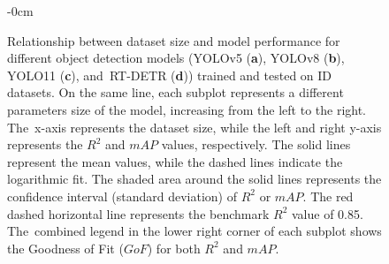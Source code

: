 \documentclass[12pt,a4paper,oneside]{report}
\newlength{\extralength}
\begin{document}
\begin{figure}[H]
\begin{adjustwidth}{-\extralength}{0cm}
\end{adjustwidth}
 \caption{Relationship %
 between dataset size and model performance 
  for different object detection models (YOLOv5 (\textbf{a}), YOLOv8 (\textbf{b}), 
  YOLO11 (\textbf{c}), and~RT-DETR (\textbf{d})) trained and tested on ID datasets. 
  On the same line, each subplot represents a different parameters size of the model,
  increasing from the left to the right. The~x-axis represents the dataset size, while
  the left and right y-axis represents the $R^2$ and $mAP$ values, respectively. 
  The solid lines represent the mean values, while the dashed lines indicate the logarithmic fit.
  The shaded area around the solid lines represents the confidence interval (standard
  deviation) of $R^2$ or $mAP$.
  The red dashed horizontal line represents the benchmark $R^2$ value of 0.85. The~combined
  legend in the lower right corner of each subplot shows the Goodness of Fit ($GoF$) for both $R^2$
  and $mAP$.}
  \label{fig:dataset_size_vs_performance}
\end{figure}
\end{document}
